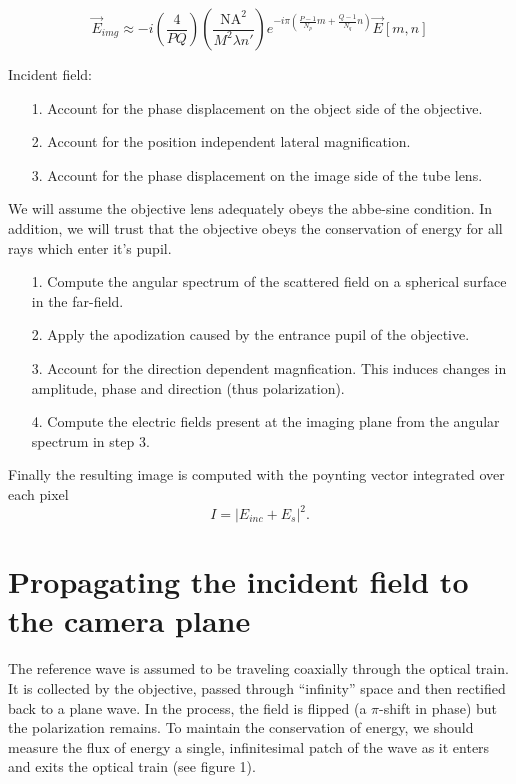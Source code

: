 \begin{equation*}
  \vec{E}_{img} \approx -i \left ( \frac{4}{PQ} \right ) \left ( \frac{\text{NA}^2}{M^2\lambda n'} \right ) e^{-i\pi \left ( \frac{P - 1}{N_p}m + \frac{Q - 1}{N_q} n \right ) }\vec{E}\left [ m, n \right ]
\end{equation*}




Incident field:
\begin{enumerate}
\item[1.] Account for the phase displacement on the object side of the objective.
\item[2.] Account for the position independent lateral magnification.
\item[3.] Account for the phase displacement on the image side of the tube lens.
\end{enumerate}

We will assume the objective lens adequately obeys the abbe-sine condition.
In addition, we will trust that the objective obeys the conservation of energy
for all rays which enter it's pupil.
\begin{enumerate}
\item[1.] Compute the angular spectrum of the scattered field on a spherical surface
  in the far-field.
\item[2.] Apply the apodization caused by the entrance pupil of the objective.
\item[3.] Account for the direction dependent magnfication. This induces changes in
  amplitude, phase and direction (thus polarization).
\item[4.] Compute the electric fields present at the imaging plane from the angular spectrum in step 3.
\end{enumerate}

Finally the resulting image is computed with the poynting vector integrated over each pixel
\begin{equation*}
  I = \left | E_{inc} + E_{s} \right |^2.
\end{equation*}


\section{Propagating the incident field to the camera plane}
  The reference wave is assumed to be traveling coaxially through the optical
  train. It is collected by the objective, passed through ``infinity'' space
  and then rectified back to a plane wave. In the process, the field is flipped 
  (a $\pi$-shift in phase) but the polarization remains. 
  To maintain the conservation of energy, we should measure the flux of energy 
  a single, infinitesimal patch of the wave as it enters and exits the optical 
  train (see figure 1).

